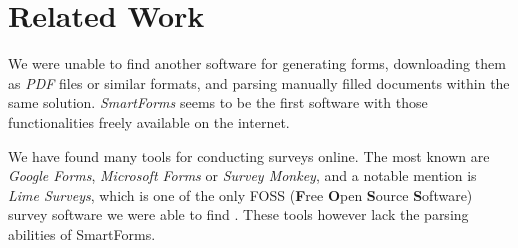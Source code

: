 \documentclass[11pt, a4paper]{report}
\begin{document}

\section{Related Work}

We were unable to find another software for generating forms, downloading them as \textit{PDF} files or similar formats, and parsing manually filled documents within the same solution. \textit{SmartForms} seems to be the first software with those functionalities freely available on the internet.

We have found many tools for conducting surveys online. The most known are \textit{Google Forms}, \textit{Microsoft Forms} or \textit{Survey Monkey}, and a notable mention is \textit{Lime Surveys}, which is one of the only FOSS (\textbf Free \textbf Open \textbf Source \textbf Software) survey software we were able to find \cite {limesurveys}. These tools however lack the parsing abilities of SmartForms.
\end{document}
